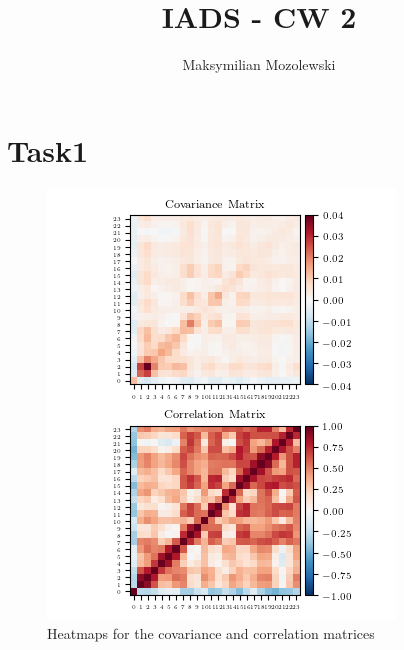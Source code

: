 \documentclass{report}
\begin{document}
\title{IADS - CW 2}
\author{Maksymilian Mozolewski}
\maketitle
\pagebreak
\section{Task1}
\begin{figure}[h]
    \raggedright
    \caption{Heatmaps for the covariance and correlation matrices}
    \includegraphics[scale=1]{Years/Year2/Semester2/Learning/CW/python_code/correlation.png}
\end{figure}
\end{document}
